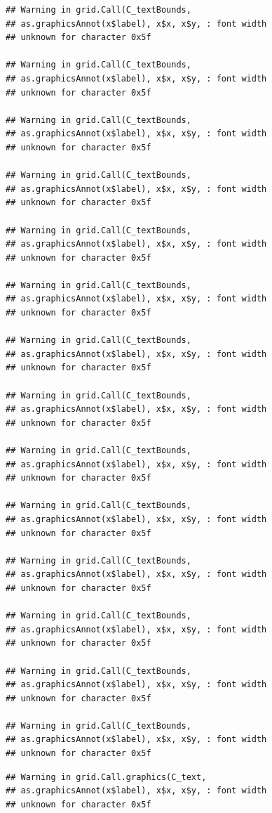 \documentclass[
]{book}
\begin{document}
\begin{verbatim}
## Warning in grid.Call(C_textBounds,
## as.graphicsAnnot(x$label), x$x, x$y, : font width
## unknown for character 0x5f

## Warning in grid.Call(C_textBounds,
## as.graphicsAnnot(x$label), x$x, x$y, : font width
## unknown for character 0x5f

## Warning in grid.Call(C_textBounds,
## as.graphicsAnnot(x$label), x$x, x$y, : font width
## unknown for character 0x5f

## Warning in grid.Call(C_textBounds,
## as.graphicsAnnot(x$label), x$x, x$y, : font width
## unknown for character 0x5f

## Warning in grid.Call(C_textBounds,
## as.graphicsAnnot(x$label), x$x, x$y, : font width
## unknown for character 0x5f

## Warning in grid.Call(C_textBounds,
## as.graphicsAnnot(x$label), x$x, x$y, : font width
## unknown for character 0x5f

## Warning in grid.Call(C_textBounds,
## as.graphicsAnnot(x$label), x$x, x$y, : font width
## unknown for character 0x5f

## Warning in grid.Call(C_textBounds,
## as.graphicsAnnot(x$label), x$x, x$y, : font width
## unknown for character 0x5f

## Warning in grid.Call(C_textBounds,
## as.graphicsAnnot(x$label), x$x, x$y, : font width
## unknown for character 0x5f

## Warning in grid.Call(C_textBounds,
## as.graphicsAnnot(x$label), x$x, x$y, : font width
## unknown for character 0x5f

## Warning in grid.Call(C_textBounds,
## as.graphicsAnnot(x$label), x$x, x$y, : font width
## unknown for character 0x5f

## Warning in grid.Call(C_textBounds,
## as.graphicsAnnot(x$label), x$x, x$y, : font width
## unknown for character 0x5f

## Warning in grid.Call(C_textBounds,
## as.graphicsAnnot(x$label), x$x, x$y, : font width
## unknown for character 0x5f

## Warning in grid.Call(C_textBounds,
## as.graphicsAnnot(x$label), x$x, x$y, : font width
## unknown for character 0x5f
\end{verbatim}

\begin{verbatim}
## Warning in grid.Call.graphics(C_text,
## as.graphicsAnnot(x$label), x$x, x$y, : font width
## unknown for character 0x5f
\end{verbatim}
\end{document}
